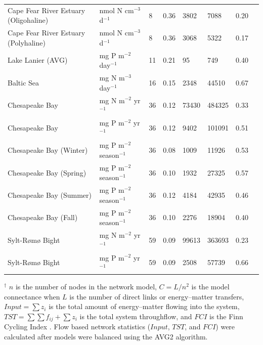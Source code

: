 \documentclass[article]{jss}
\begin{document}
\begin{table}[ht]
\begin{center}
\begin{tiny}
\begin{tabularx}{\textwidth}{llllllll}
      Cape Fear River Estuary (Oligohaline) & nmol N cm$^{-3}$ d$^{-1}$ &   8 & 0.36 & 3802 & 7088 & 0.20 & \citet{hines12} \\
      Cape Fear River Estuary (Polyhaline) & nmol N cm$^{-3}$ d$^{-1}$ &   8 & 0.36 & 3068 & 5322 & 0.17 & \citet{hines15} \\
      Lake Lanier (AVG) & mg P m$^{-2}$ day$^{-1}$ &  11 & 0.21 &  95 & 749 & 0.40 & \citet{borrett07_lanier} \\
      Baltic Sea & mg N m$^{-3}$ day$^{-1}$  &  16 & 0.15 & 2348 & 44510 & 0.67 & \citet{hinrichsen98_baltic} \\
      Chesapeake Bay & mg N m$^{-2}$ yr$^{-1}$  &  36 & 0.12 & 73430 & 484325 & 0.33 & \citet{baird95} \\
      Chesapeake Bay & mg P m$^{-2}$ yr$^{-1}$ &  36 & 0.12 & 9402 & 101091 & 0.51 & \citet{ulanowicz99} \\
      Chesapeake Bay (Winter) & mg P m$^{-2}$ season$^{-1}$ &  36 & 0.08 & 1009 & 11926 & 0.53 & \citet{ulanowicz99} \\
      Chesapeake Bay (Spring) & mg P m$^{-2}$ season$^{-1}$ &  36 & 0.10 & 1932 & 27325 & 0.57 & \citet{ulanowicz99} \\
      Chesapeake Bay (Summer) & mg P m$^{-2}$ season$^{-1}$ &  36 & 0.12 & 4184 & 42935 & 0.46 & \citet{ulanowicz99} \\
      Chesapeake Bay (Fall) & mg P m$^{-2}$ season$^{-1}$ &  36 & 0.10 & 2276 & 18904 & 0.40 & \citet{ulanowicz99} \\
      Sylt-R{\o}m{\o} Bight & mg N m$^{-2}$ yr$^{-1}$  &  59 & 0.09 & 99613 & 363693 & 0.23 & \citet{baird08_sylt} \\
      Sylt-R{\o}m{\o} Bight & mg P m$^{-2}$ yr$^{-1}$  &  59 & 0.09 & 2508 & 57739 & 0.66 & \citet{baird08_sylt} \\
      \hline
    \end{tabularx}
  \end{tiny}
\end{center}
\begin{scriptsize}
  $^\dagger$ $n$ is the number of nodes in the network model,
  $C=L/n^2$ is the model connectance when $L$ is the number of direct
  links or energy--matter transfers, $Input =\sum{z_i}$ is the total
  amount of energy--matter flowing into the system,
  $TST=\sum\sum{f_{ij}}+\sum{z_i}$ is the total system throughflow,
  and $FCI$ is the Finn Cycling Index \citep{finn80}. Flow based
  network statistics ($Input$, $TST$, and $FCI$) were calculated after
  models were balanced using the AVG2 algorithm.
\end{scriptsize}
\end{table}
\end{document}
